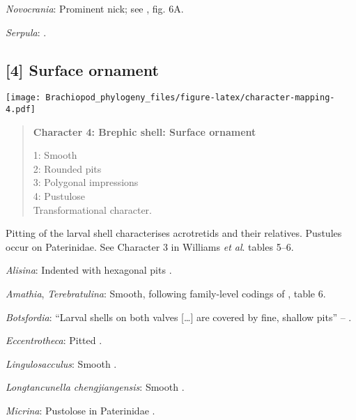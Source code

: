 \documentclass[openany]{book}
\theoremstyle{definition}
\theoremstyle{definition}
\theoremstyle{definition}
\theoremstyle{remark}
\begin{document}
\hypertarget{Novocrania-coding-3}{}
\emph{Novocrania}: Prominent nick; see \citet{Freeman1999Changesin},
fig. 6A.

\hypertarget{Serpula-coding-3}{}
\emph{Serpula}: \citet{Wanninger2002C}.

\subsection*{{[}4{]} Surface ornament}\label{surface-ornament}

\texttt{[image: Brachiopod\_phylogeny\_files/figure-latex/character-mapping-4.pdf]}

\begin{quote}
\textbf{Character 4: Brephic shell: Surface ornament}

1: Smooth\\
2: Rounded pits\\
3: Polygonal impressions\\
4: Pustulose\\
Transformational character.
\end{quote}

Pitting of the larval shell characterises acrotretids and their
relatives. Pustules occur on Paterinidae. See Character 3 in Williams
\emph{et al}. \citeyearpar{Williams2000LinguliformeaCraniiformea} tables
5--6.

\hypertarget{Alisina-coding-4}{}
\emph{Alisina}: Indented with hexagonal pits \citep[appendix
2]{Williams1998Thediversity}.

\hypertarget{Amathia-coding-4}{}
\emph{Amathia}, \emph{Terebratulina}: Smooth, following family-level
codings of \citet{Williams2000LinguliformeaCraniiformea}, table 6.

\hypertarget{Botsfordia-coding-4}{}
\emph{Botsfordia}: ``Larval shells on both valves {[}\ldots{}{]} are
covered by fine, shallow pits'' -- \citet{Topper2013Reappraisalof}.

\hypertarget{Eccentrotheca-coding-4}{}
\emph{Eccentrotheca}: Pitted \citep[table
8]{Williams2000LinguliformeaCraniiformea}.

\hypertarget{Lingulosacculus-coding-4}{}
\emph{Lingulosacculus}: Smooth \citep{Holmer1997EarlyCambrian, Li2004}.

\hypertarget{Longtancunella_chengjiangensis-coding-4}{}
\emph{Longtancunella chengjiangensis}: Smooth
\citep{Holmer2011Firstrecord}.

\hypertarget{Micrina-coding-4}{}
\emph{Micrina}: Pustolose in Paterinidae \citep[table
6]{Williams2000LinguliformeaCraniiformea}.
\end{document}

